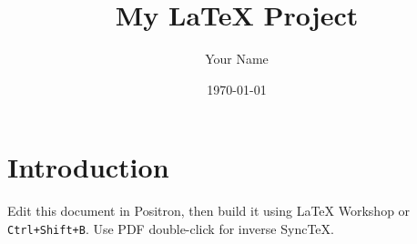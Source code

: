\documentclass[11pt,letterpaper]{article}
\title{My LaTeX Project}
\author{Your Name}
\date{\today}
\begin{document}
\maketitle

\section{Introduction}
Edit this document in Positron, then build it using LaTeX Workshop
or \texttt{Ctrl+Shift+B}. Use PDF double-click for inverse SyncTeX.
\end{document}
